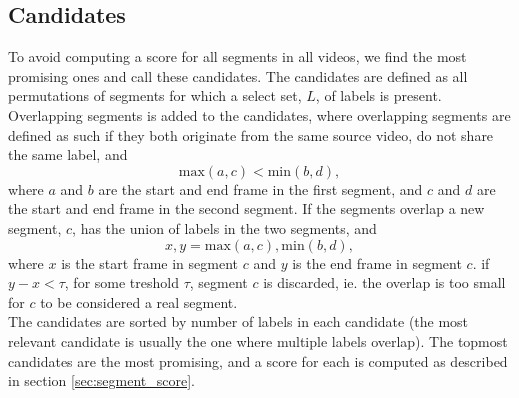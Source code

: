 \subsection{Candidates}
%
To avoid computing a score for all segments in all videos, we find the most promising ones and call these candidates. The candidates are defined as all permutations of segments for which a select set, $L$, of labels is present.
Overlapping segments is added to the candidates, where overlapping segments are defined as such if they both originate from the same source video, do not share the same label, and 
%
\[
\text{max}(a, c) < \text{min}(b, d),
\]
%
where $a$ and $b$ are the start and end frame in the first segment, and $c$ and $d$ are the start and end frame in the second segment. If the segments overlap a new segment, $c$, has the union of labels in the two segments, and
%
\[
x,y = \text{max}(a, c), \text{min}(b, d),
\]
%
where $x$ is the start frame in segment $c$ and $y$ is the end frame in segment $c$. if $y-x < \tau$, for some treshold $\tau$, segment $c$ is discarded, ie. the overlap is too small for $c$ to be considered a real segment.\\
The candidates are sorted by number of labels in each candidate (the most relevant candidate is usually the one where multiple labels overlap). The topmost candidates are the most promising, and a score for each is computed as described in section \ref{sec:segment_score}.
%